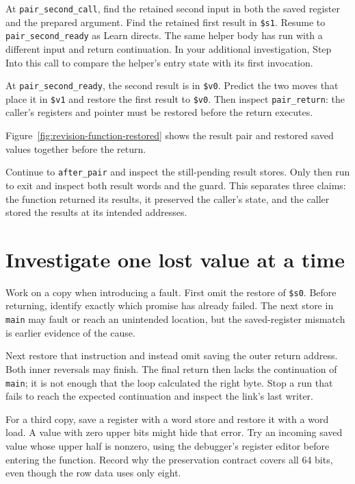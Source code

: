 At \texttt{pair\_second\_call}, find the retained second input in both the saved
register and the prepared argument. Find the retained first result in
\texttt{\$s1}. Resume to \texttt{pair\_second\_ready} as Learn directs. The
same helper body has run with a different input and return continuation. In your
additional investigation, Step Into this call to compare the helper's entry state
with its first invocation.

At \texttt{pair\_second\_ready}, the second result is in \texttt{\$v0}. Predict
the two moves that place it in \texttt{\$v1} and restore the first result to
\texttt{\$v0}. Then inspect \texttt{pair\_return}: the caller's registers and
pointer must be restored before the return executes.

Figure~\ref{fig:revision-function-restored} shows the result pair and restored
saved values together before the return.



Continue to \texttt{after\_pair} and inspect the still-pending result stores.
Only then run to exit and inspect both result words and the guard. This separates
three claims: the function returned its results, it preserved the caller's state,
and the caller stored the results at its intended addresses.

\section{Investigate one lost value at a time}

Work on a copy when introducing a fault. First omit the restore of
\texttt{\$s0}. Before returning, identify exactly which promise has already
failed. The next store in \texttt{main} may fault or reach an unintended location,
but the saved-register mismatch is earlier evidence of the cause.

Next restore that instruction and instead omit saving the outer return address.
Both inner reversals may finish. The final return then lacks the continuation of
\texttt{main}; it is not enough that the loop calculated the right byte. Stop a
run that fails to reach the expected continuation and inspect the link's last
writer.

For a third copy, save a register with a word store and restore it with a word
load. A value with zero upper bits might hide that error. Try an incoming saved
value whose upper half is nonzero, using the debugger's register editor before
entering the function. Record why the preservation contract covers all 64 bits,
even though the row data uses only eight.

